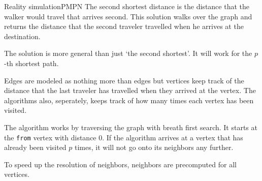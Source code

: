 \documentclass{writeup}
\begin{document}
\begin{solutions}
  \begin{solution}{Reality simulation}{PM}{PN}
    The second shortest distance is the distance that the walker would travel that arrives second.
    This solution walks over the graph and returns the distance that the second traveler travelled when he arrives at the destination.

    The solution is more general than just `the second shortest'.
    It will work for the $p$-th shortest path.


    Edges are modeled as nothing more than edges but vertices keep track of the distance that the last traveler has travelled when they arrived at the vertex.
    The algorithms also, seperately, keeps track of how many times each vertex has been visited.


    The algorithm works by traversing the graph with breath first search.
    It starts at the \texttt{from} vertex with distance $0$.
    If the algorithm arrives at a vertex that has already been visited $p$ times, it will not go onto its neighbors any further.


    To speed up the resolution of neighbors, neighbors are precomputed for all vertices.


  \end{solution}
\end{solutions}
\end{document}
